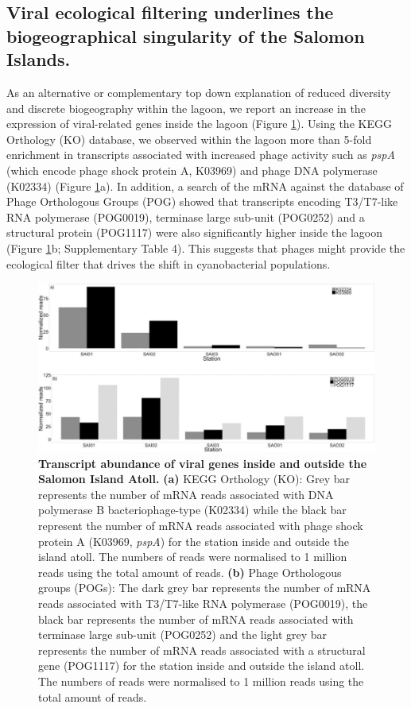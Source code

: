 \subsection{Viral ecological filtering underlines the biogeographical singularity of the Salomon Islands.}

As an alternative or complementary top down explanation of reduced diversity and discrete biogeography within the lagoon, we report an increase in the expression of viral-related genes inside the lagoon (Figure \ref{Chagos_fig5}). Using the KEGG Orthology (KO) database, we observed within the lagoon more than 5-fold enrichment in transcripts associated with increased phage activity such as {\em pspA} (which encode phage shock protein A, K03969) and phage DNA polymerase (K02334) (Figure \ref{Chagos_fig5}a). In addition, a search of the mRNA against the database of Phage Orthologous Groups (POG) \cite{kristensen_orthologous_2013} showed that transcripts encoding T3/T7-like RNA polymerase (POG0019), terminase large sub-unit (POG0252) and a structural protein (POG1117) were also significantly higher inside the lagoon (Figure \ref{Chagos_fig5}b; Supplementary Table 4). This suggests that phages might provide the ecological filter that drives the shift in cyanobacterial populations. \cite{bowler_genetics_2014, kao_diel_2005}

\begin{figure}
    \centering
    \includegraphics[width=\textwidth]{Chagos/figures/fig5}
    \caption{\textbf{Transcript abundance of viral genes inside and outside the Salomon Island Atoll.} \textbf{(a)} KEGG Orthology (KO): Grey bar represents the number of mRNA reads associated with DNA polymerase B bacteriophage-type (K02334) while the black bar represent the number of mRNA reads associated with phage shock protein A (K03969, {\em pspA}) for the station inside and outside the island atoll. The numbers of reads were normalised to 1 million reads using the total amount of reads. \textbf{(b)} Phage Orthologous groups (POGs): The dark grey bar represents the number of mRNA reads associated with T3/T7-like RNA polymerase (POG0019), the black bar represents the number of mRNA reads associated with terminase large sub-unit (POG0252) and the light grey bar represents the number of mRNA reads associated with a structural gene (POG1117) for the station inside and outside the island atoll. The numbers of reads were normalised to 1 million reads using the total amount of reads.}
    \label{Chagos_fig5}
\end{figure}

